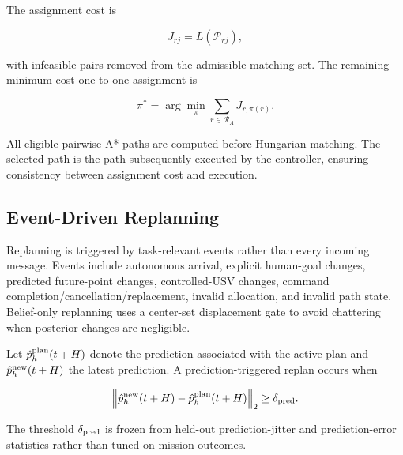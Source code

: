 \documentclass[conference]{IEEEtran}
\begin{document}
The assignment cost is

\begin{equation}
J_{rj}=L(\mathcal{P}_{rj}),
\label{eq:path_cost}
\end{equation}

with infeasible pairs removed from the admissible matching set. The remaining
minimum-cost one-to-one assignment is

\begin{equation}
\pi^*=\arg\min_{\pi}
\sum_{r\in\mathcal{R}_A}J_{r,\pi(r)}.
\label{eq:assignment}
\end{equation}

All eligible pairwise A* paths are computed before Hungarian matching. The
selected path is the path subsequently executed by the controller, ensuring
consistency between assignment cost and execution.

\subsection{Event-Driven Replanning}

Replanning is triggered by task-relevant events rather than every incoming
message. Events include autonomous arrival, explicit human-goal changes,
predicted future-point changes, controlled-USV changes, command
completion/cancellation/replacement, invalid allocation, and invalid path
state. Belief-only replanning uses a center-set displacement gate to avoid
chattering when posterior changes are negligible.

Let $\hat p_h^{\rm plan}(t+H)$ denote the prediction associated with the active
plan and $\hat p_h^{\rm new}(t+H)$ the latest prediction. A prediction-triggered
replan occurs when

\begin{equation}
\left\|\hat p_h^{\rm new}(t+H)-
\hat p_h^{\rm plan}(t+H)\right\|_2
\geq\delta_{\rm pred}.
\label{eq:prediction_trigger}
\end{equation}

The threshold $\delta_{\rm pred}$ is frozen from held-out prediction-jitter and
prediction-error statistics rather than tuned on mission outcomes.
\end{document}
